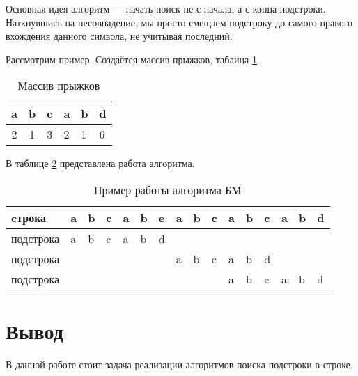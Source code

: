 Основная идея алгоритм — начать поиск не с начала, а с конца подстроки.
Наткнувшись на несовпадение, мы просто смещаем подстроку до самого правого вхождения данного символа, не учитывая последний.

Рассмотрим пример. Создаётся массив прыжков, таблица \ref{tbl:bm-shift-analysis}.

\begin{table}[!h]
	\begin{center}
		\begin{tabular}{|c|c|c|l|l|l|}
			\hline
			a & b & c & a & b & d \\ \hline
			2 & 1 & 3 & 2 & 1 & 6 \\ \hline
		\end{tabular}
	\end{center}
	\caption{Массив прыжков}
	\label{tbl:bm-shift-analysis}
\end{table}

В таблице \ref{tbl:bm-example-analysis} представлена работа алгоритма.

\begin{table}[!h]
	\begin{center}
		\begin{tabular}{|l|l|l|l|l|l|l|l|l|l|l|l|l|l|l|l|}
			\hline
			cтрока    & a & b & c & a & b & e                         & a & b & c & a                         & b                         & c                         & a                         & b                         & d                         \\ \hline
			подстрока & a & b & c & a & b & \cellcolor[HTML]{FE0000}d &   &   &   &                           &                           &                           &                           &                           &                           \\ \hline
			подстрока &   &   &   &   &   &                           & a & b & c & a                         & b                         & \cellcolor[HTML]{FE0000}d &                           &                           &                           \\ \hline
			подстрока &   &   &   &   &   &                           &   &   &   & \cellcolor[HTML]{34FF34}a & \cellcolor[HTML]{34FF34}b & \cellcolor[HTML]{34FF34}c & \cellcolor[HTML]{34FF34}a & \cellcolor[HTML]{34FF34}b & \cellcolor[HTML]{34FF34}d \\ \hline
		\end{tabular}
	\end{center}
	\caption{Пример работы алгоритма БМ}
	\label{tbl:bm-example-analysis}
\end{table}


\section*{Вывод}

В данной работе стоит задача реализации алгоритмов поиска подстроки в строке.
